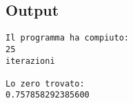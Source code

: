 \subsection*{Output}
\begin{lstlisting}
Il programma ha compiuto:
25
iterazioni

Lo zero trovato:
0.757858292385600
\end{lstlisting}
\vfill

\cleardoublepage
\listoffigures\thispagestyle{fancy}

\cleardoublepage
\printbibliography{}\thispagestyle{fancy}